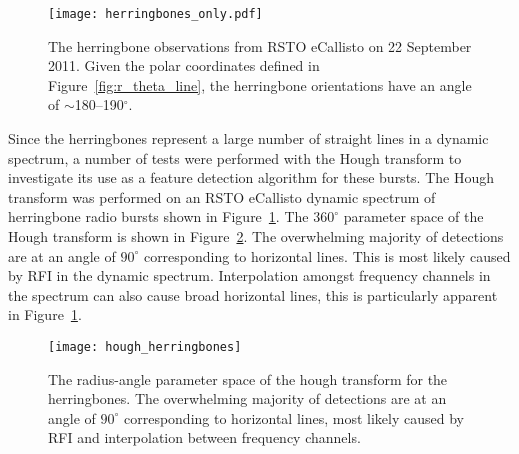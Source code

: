\begin{figure}[t!]
\begin{center}
\texttt{[image: herringbones\_only.pdf]}
\caption[Herringbone observations]{The herringbone observations from RSTO eCallisto on 22 September 2011. Given the polar coordinates defined in Figure~\ref{fig:r_theta_line}, the herringbone orientations have an angle of $\sim$180--190$^{\circ}$.}
\label{fig:herringbones_only}
\end{center}
\end{figure}
Since the herringbones represent a large number of straight lines in a dynamic spectrum, a number of tests were performed with the Hough transform to investigate its use as a feature detection algorithm for these bursts. The Hough transform was performed on an RSTO eCallisto dynamic spectrum of herringbone radio bursts shown in Figure~\ref{fig:herringbones_only}. The $360^{\circ}$ parameter space of the Hough transform is shown in Figure~\ref{fig:hough_space}. The overwhelming majority of detections are at an angle of $90^{\circ}$ corresponding to horizontal lines. This is most likely caused by RFI in the dynamic spectrum. Interpolation amongst frequency channels in the spectrum can also cause broad horizontal lines, this is particularly apparent in Figure~\ref{fig:herringbones_only}.
\begin{figure}[t!]
\begin{center}
\texttt{[image: hough\_herringbones]}
\caption[Hough transform]{The radius-angle parameter space of the hough transform for the herringbones. The overwhelming majority of detections are at an angle of $90^{\circ}$ corresponding to horizontal lines, most likely caused by RFI and interpolation between frequency channels.}
\label{fig:hough_space}
\end{center}
\end{figure}
%
%

